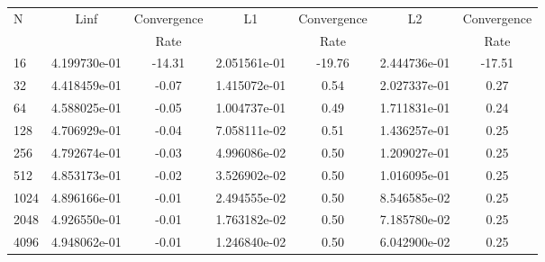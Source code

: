\documentclass[12pt]{article}
\begin{document}
	\begin{tabular}{l|c|c|c|c|c|c}
		N&Linf&Convergence&L1&Convergence&L2&Convergence\\
		&&Rate&&Rate&&Rate\\
		\hline
		16&4.199730e-01&-14.31&2.051561e-01&-19.76&2.444736e-01&-17.51\\
		\hline
		32&4.418459e-01&-0.07&1.415072e-01&0.54&2.027337e-01&0.27\\
		\hline
		64&4.588025e-01&-0.05&1.004737e-01&0.49&1.711831e-01&0.24\\
		\hline
		128&4.706929e-01&-0.04&7.058111e-02&0.51&1.436257e-01&0.25\\
		\hline
		256&4.792674e-01&-0.03&4.996086e-02&0.50&1.209027e-01&0.25\\
		\hline
		512&4.853173e-01&-0.02&3.526902e-02&0.50&1.016095e-01&0.25\\
		\hline
		1024&4.896166e-01&-0.01&2.494555e-02&0.50&8.546585e-02&0.25\\
		\hline
		2048&4.926550e-01&-0.01&1.763182e-02&0.50&7.185780e-02&0.25\\
		\hline
		4096&4.948062e-01&-0.01&1.246840e-02&0.50&6.042900e-02&0.25\\
	\end{tabular}
\end{document}
